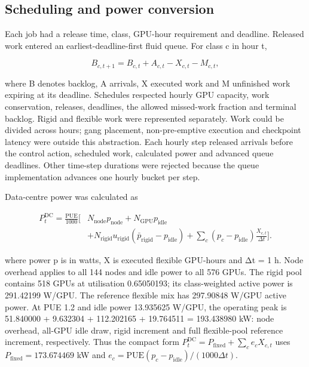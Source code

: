 \documentclass[10pt,a4paper]{article}
\begin{document}
\subsection*{Scheduling and power conversion}

Each job had a release time, class, GPU-hour requirement and deadline. Released work entered an earliest-deadline-first fluid queue. For class c in hour t,


\begin{equation*}
B_{c,t+1}=B_{c,t}+A_{c,t}-X_{c,t}-M_{c,t},
\end{equation*}

where B denotes backlog, A arrivals, X executed work and M unfinished work expiring at its deadline. Schedules respected hourly GPU capacity, work conservation, releases, deadlines, the allowed missed-work fraction and terminal backlog. Rigid and flexible work were represented separately. Work could be divided across hours; gang placement, non-pre-emptive execution and checkpoint latency were outside this abstraction. Each hourly step released arrivals before the control action, scheduled work, calculated power and advanced queue deadlines. Other time-step durations were rejected because the queue implementation advances one hourly bucket per step.


Data-centre power was calculated as


\begin{equation*}
\begin{aligned}
P^{\mathrm{DC}}_t=\frac{\mathrm{PUE}}{1000}\Big[&N_{\mathrm{node}}p_{\mathrm{node}}+N_{\mathrm{GPU}}p_{\mathrm{idle}}\\
&+N_{\mathrm{rigid}}u_{\mathrm{rigid}}(\bar p_{\mathrm{rigid}}-p_{\mathrm{idle}})
+\sum_c(p_c-p_{\mathrm{idle}})\frac{X_{c,t}}{\Delta t}\Big].
\end{aligned}
\end{equation*}

where power p is in watts, X is executed flexible GPU-hours and Δt = 1 h. Node overhead applies to all 144 nodes and idle power to all 576 GPUs. The rigid pool contains 518 GPUs at utilisation 0.65050193; its class-weighted active power is 291.42199 W/GPU. The reference flexible mix has 297.90848 W/GPU active power. At PUE 1.2 and idle power 13.935625 W/GPU, the operating peak is 51.840000 + 9.632304 + 112.202165 + 19.764511 = 193.438980 kW: node overhead, all-GPU idle draw, rigid increment and full flexible-pool reference increment, respectively. Thus the compact form \(P^{\mathrm{DC}}_t=P_{\mathrm{fixed}}+\sum_c e_cX_{c,t}\) uses \(P_{\mathrm{fixed}}=173.674469\) kW and \(e_c=\mathrm{PUE}(p_c-p_{\mathrm{idle}})/(1000\Delta t)\).
\end{document}
